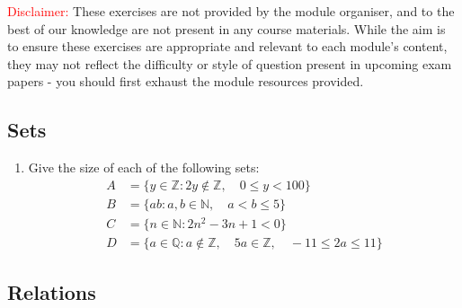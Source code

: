 \documentclass[a4paper, 12pt]{article}
\begin{document}
{\small \textcolor{red}{Disclaimer:}
These exercises are not provided by the module organiser, and to the best of our knowledge are not present in any course materials.
While the aim is to ensure these exercises are appropriate and relevant to each module's content, they may not reflect the difficulty or style of question present in upcoming exam papers - you should first exhaust the module resources provided.
}

\subsection*{Sets}

\begin{enumerate}
    
    \item Give the size of each of the following sets:
    \begin{align*} 
        A &= \{ y \in \mathbb{Z} : 2y \notin \mathbb{Z}, \quad 0 \leq y < 100 \} \\
        B &= \{ ab : a, b \in \mathbb{N}, \quad a < b \leq 5 \} \\
        C &= \{ n \in \mathbb{N} : 2n^2 - 3n + 1 < 0 \} \\
        D &= \{ a \in \mathbb{Q} : a \notin \mathbb{Z}, \quad 5a \in \mathbb{Z}, \quad -11 \leq 2a \leq 11 \}
    \end{align*}

\end{enumerate}

\subsection*{Relations}
\end{document}
